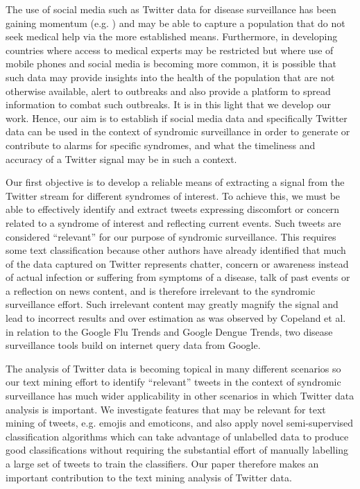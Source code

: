 \documentclass[10pt,letterpaper]{article}
\begin{document}
The use of social media such as Twitter data for disease surveillance has been gaining momentum (e.g. \cite{REF4,REF42,REF3,REF1,REF9,REF2,REF18}) and may be able to capture a population that do not seek medical help via the more established means. Furthermore, in developing countries where access to medical experts may be restricted but where use of mobile phones and social media is becoming more common, it is possible that such data may provide insights into the health of the population that are not otherwise available, alert to outbreaks and also provide a platform to spread information to combat such outbreaks.   It is in this light that we develop our work. Hence, our aim is to establish if social media data and specifically Twitter data can be used in the context of syndromic surveillance in order to generate or contribute to alarms for specific syndromes, and what the timeliness and accuracy of a Twitter signal may be in such a context. 

Our first objective is to develop a reliable means of extracting a signal from the Twitter stream for different syndromes of interest. To achieve this, we must be able to effectively identify and extract tweets expressing discomfort or concern related to a syndrome of interest and reflecting current events.  Such tweets are considered ``relevant'' for our purpose of syndromic surveillance. This requires some text classification because other authors \cite{REF78,REF18} have already identified that much of the data captured on Twitter represents chatter, concern or awareness instead of actual infection or suffering from symptoms of a disease, talk of past events or a reflection on news content, and is therefore irrelevant to the syndromic surveillance effort.   Such irrelevant content may greatly magnify the signal and lead to incorrect results and over estimation as was observed by Copeland et al. \cite{REF79} in relation to the Google Flu Trends and Google Dengue Trends, two disease surveillance tools build on internet query data from Google.   

 The analysis of Twitter data is becoming topical in many different scenarios so our text mining effort to identify ``relevant'' tweets in the context of syndromic surveillance has much wider applicability in other scenarios in which Twitter data analysis is important.  We investigate features that may be relevant for text mining of tweets, e.g. emojis and emoticons, and also apply novel semi-supervised classification algorithms which can take advantage of unlabelled data to produce good classifications without requiring the substantial effort of manually labelling a large set of tweets to train the classifiers.   Our paper therefore makes an important contribution to the text mining analysis of Twitter data.
\end{document}
